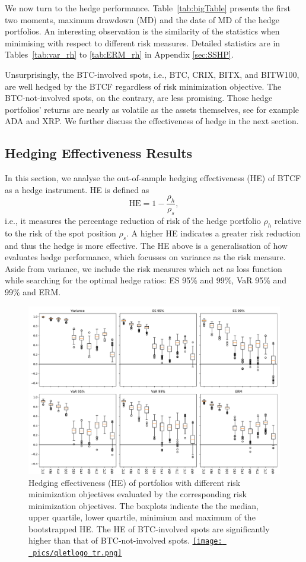 We now turn to the hedge performance. 
Table~\ref{tab:bigTable}
presents the first two moments, maximum drawdown (MD) and the date of
MD of the hedge portfolios. An interesting observation is the similarity of
the statistics when minimising with respect to different risk measures.
Detailed statistics are in Tables~\ref{tab:var_rh} to \ref{tab:ERM_rh} in Appendix
\ref{sec:SSHP}. 
 
Unsurprisingly, the BTC-involved spots, i.e., BTC, CRIX, BITX, and
BITW100, are well hedged by the BTCF regardless of risk minimization
objective. 
The BTC-not-involved spots, on the contrary, are less promising. Those
hedge portfolios' returns are nearly as volatile as the
assets themselves, see for example ADA and XRP. 
We further discuss the effectiveness of hedge in the next
section. %

\subsection{Hedging Effectiveness Results}\label{sec: HE results}
In this section, we analyse the out-of-sample hedging effectiveness
(HE) of BTCF as a hedge instrument. 
HE is defined as $$\text{HE} = 1-\frac{\rho_h}{\rho_s},$$
i.e., it measures the percentage reduction of risk of the hedge
portfolio $\rho_h $ relative to the risk of the spot position $\rho_s$.
A higher HE indicates a greater risk reduction and thus the hedge is
more effective.  
The HE above is a generalisation of how \citet{ederington1979hedging}
evaluates hedge performance, which focusses on variance as the risk
measure. 
Aside from variance, we include the risk measures which act as
loss function while searching for the optimal hedge ratios: ES 95\%
and 99\%, VaR 95\% and 99\% and ERM.

\begin{figure}[t]
  \includegraphics[width=\textwidth]{_pics/HE_boxplot.pdf}
    \caption{Hedging effectiveness (HE) of portfolios with different risk minimization objectives evaluated by the corresponding risk minimization objectives.
              The boxplots indicate the the median, upper quartile, lower quartile, minimium and maximum of the bootstrapped HE.
              The HE of BTC-involved spots are significantly higher than that of BTC-not-involved spots.
    \href{http://www.quantlet.com/}{\texttt{[image: \_pics/qletlogo\_tr.png]}} }
  \label{fig:HEboxplot}
  \end{figure}

